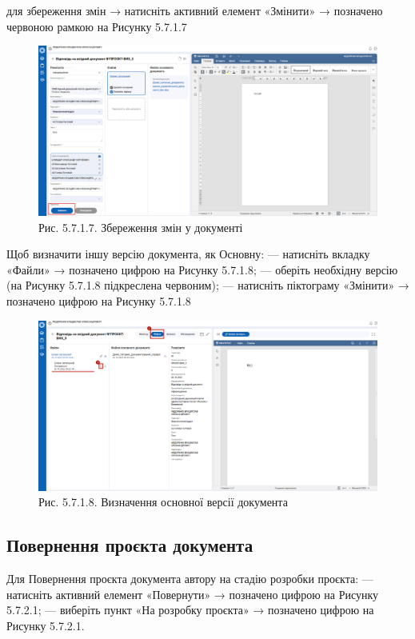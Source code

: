 для збереження змін → натисніть активний елемент «Змінити» → позначено
червоною рамкою на Рисунку 5.7.1.7

\begin{figure}[!htbp]
\centerline{\includegraphics[width=\textwidth]{img/5.7.1.7.png}}
\caption{Рис. 5.7.1.7. Збереження змін у документі}
\end{figure}

Щоб визначити іншу версію документа, як Основну:
--- натисніть вкладку «Файли» → позначено цифрою  на Рисунку 5.7.1.8;
--- оберіть необхідну версію (на Рисунку 5.7.1.8 підкреслена червоним);
--- натисніть піктограму «Змінити» → позначено цифрою  на Рисунку 5.7.1.8

\begin{figure}[!htbp]
\centerline{\includegraphics[width=\textwidth]{img/5.7.1.8.png}}
\caption{Рис. 5.7.1.8. Визначення основної версії документа}
\end{figure}

\subsection{Повернення проєкта документа}

Для Повернення проєкта документа автору на стадію розробки проєкта:
--- натисніть активний елемент «Повернути» → позначено цифрою  на Рисунку 5.7.2.1;
--- виберіть пункт «На розробку проєкта» → позначено цифрою  на Рисунку 5.7.2.1.

